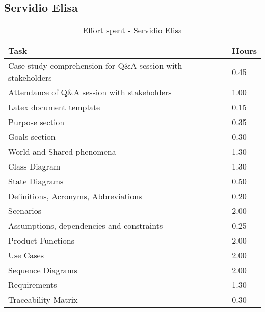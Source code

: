 \subsection{Servidio Elisa}
\renewcommand{\arraystretch}{2}
\begin{longtable}{|m{9cm}|m{1.2cm}|}
\caption{Effort spent - Servidio Elisa}\\
\hline
\endfirsthead
\endhead
\hline
\endlastfoot
\rowcolor{green2}
\textbf{Task} &\hfil {\textbf{Hours}}\\
\hline
Case study comprehension for Q\&A session with stakeholders & \hfil 0.45\\
Attendance of Q\&A session with stakeholders & \hfil 1.00\\
Latex document template & \hfil 0.15\\
Purpose section	& \hfil 0.35\\
Goals section & \hfil 0.30\\
World and Shared phenomena & \hfil 1.30\\
Class Diagram & \hfil 1.30\\
State Diagrams & \hfil 0.50\\
Definitions, Acronyms, Abbreviations & \hfil 0.20\\
Scenarios & \hfil 2.00\\
Assumptions, dependencies and constraints & \hfil 0.25\\
Product Functions & \hfil 2.00\\
Use Cases & \hfil 2.00\\
Sequence Diagrams & \hfil 2.00\\
Requirements & \hfil 1.30\\
Traceability Matrix & \hfil 0.30\\
\hline
\end{longtable}

